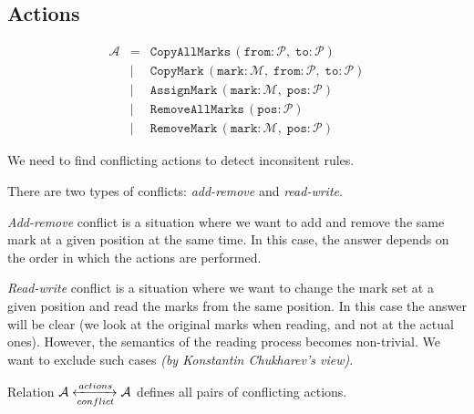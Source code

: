 \documentclass{article}
\newcommand{\cActions}{\xleftrightarrow[conflict]{actions}}
\begin{document}
\subsection{Actions}
\[
\begin{array}{rcl}
\mathcal{A} & =    & \texttt{CopyAllMarks}\,(\texttt{from} : \mathcal{P},\; \texttt{to} : \mathcal{P}) \\
            & \mid & \texttt{CopyMark}\,(\texttt{mark} : \mathcal{M},\; \texttt{from} : \mathcal{P},\; \texttt{to} : \mathcal{P}) \\
            & \mid & \texttt{AssignMark}\,(\texttt{mark} : \mathcal{M},\; \texttt{pos} : \mathcal{P}) \\
            & \mid & \texttt{RemoveAllMarks}\,(\texttt{pos} : \mathcal{P}) \\
            & \mid & \texttt{RemoveMark}\,(\texttt{mark} : \mathcal{M},\; \texttt{pos} : \mathcal{P})
\end{array}
\]

We need to find conflicting actions to detect inconsitent rules.

There are two types of conflicts: \textit{add-remove} and \textit{read-write}.

\textit{Add-remove} conflict is a situation where we want to add and remove the same mark at a given position at the same time. In this case, the answer depends on the order in which the actions are performed.

\textit{Read-write} conflict is a situation where we want to change the mark set at a given position and read the marks from the same position. In this case the answer will be clear (we look at the original marks when reading, and not at the actual ones). However, the semantics of the reading process becomes non-trivial. We want to exclude such cases \textit{(by Konstantin Chukharev's view)}.


\noindent Relation $\mathcal{A} \cActions \mathcal{A}$ defines all pairs of conflicting actions.
\end{document}
